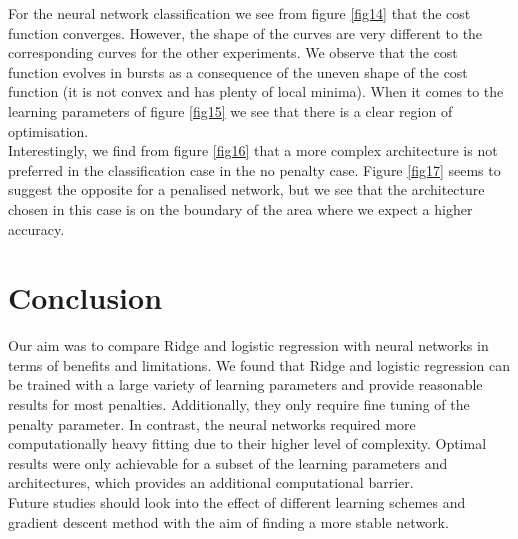 \documentclass[notitlepage, reprint, nofootinbib]{revtex4-1}
\begin{document}
For the neural network classification we see from figure \ref{fig14} that the cost function converges. However, the shape of the curves are very different to the corresponding curves for the other experiments. We observe that the cost function evolves in bursts as a consequence of the uneven shape of the cost function (it is not convex and has plenty of local minima). When it comes to the learning parameters of figure \ref{fig15} we see that there is a clear region of optimisation. \\[2mm]
Interestingly, we find from figure \ref{fig16} that a more complex architecture is not preferred in the classification case in the no penalty case. Figure \ref{fig17} seems to suggest the opposite for a penalised network, but we see that the architecture chosen in this case is on the boundary of the area where we expect a higher accuracy. 
\section{Conclusion}
Our aim was to compare Ridge and logistic regression with neural networks in terms of benefits and limitations. We found that Ridge and logistic regression can be trained with a large variety of learning parameters and provide reasonable results for most penalties. Additionally, they only require fine tuning of the penalty parameter. In contrast, the neural networks required more computationally heavy fitting due to their higher level of complexity. Optimal results were only achievable for a subset of the learning parameters and architectures, which provides an additional computational barrier. \\[2mm]
Future studies should look into the effect of different learning schemes and gradient descent method with the aim of finding a more stable network. 



\end{document}
